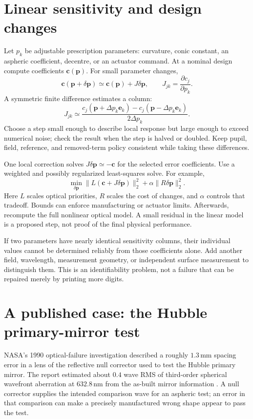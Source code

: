 \section{Linear sensitivity and design changes}
Let $p_k$ be adjustable prescription parameters: curvature, conic
constant, an aspheric coefficient, decentre, or an actuator command.
At a nominal design compute coefficients $\bm c(\bm p)$. For small
parameter changes,
\begin{equation}
 \bm c(\bm p+\delta\bm p)\simeq\bm c(\bm p)+J\delta\bm p,
 \qquad J_{jk}=\frac{\partial c_j}{\partial p_k}.
\end{equation}
A symmetric finite difference estimates a column:
\begin{equation}
 J_{jk}\simeq\frac{c_j(\bm p+\Delta p_k\bm e_k)
                       -c_j(\bm p-\Delta p_k\bm e_k)}{2\Delta p_k}.
\end{equation}
Choose a step small enough to describe local response but large enough
to exceed numerical noise; check the result when the step is halved
or doubled. Keep pupil, field, reference, and removed-term policy
consistent while taking these differences.

One local correction solves $J\delta\bm p\simeq-\bm c$ for the
selected error coefficients. Use a weighted and possibly regularized
least-squares solve. For example,
\begin{equation}
 \min_{\delta\bm p}
   \lVert L(\bm c+J\delta\bm p)\rVert_2^2
      +\alpha\lVert R\delta\bm p\rVert_2^2.
\end{equation}
Here $L$ scales optical priorities, $R$ scales the cost of changes,
and $\alpha$ controls that tradeoff. Bounds can enforce manufacturing
or actuator limits. Afterwards, recompute the full nonlinear optical
model. A small residual in the linear model is a proposed step, not
proof of the final physical performance.

If two parameters have nearly identical sensitivity columns, their
individual values cannot be determined reliably from those coefficients
alone. Add another field, wavelength, measurement geometry, or
independent surface measurement to distinguish them. This is an
identifiability problem, not a failure that can be repaired merely by
printing more digits.

\section{A published case: the Hubble primary-mirror test}
NASA's 1990 optical-failure investigation described a roughly
$1.3\,\mathrm{mm}$ spacing error in a lens of the reflective null
corrector used to test the Hubble primary mirror. The report estimated
about $0.4$ wave RMS of third-order spherical wavefront aberration at
$632.8\,\mathrm{nm}$ from the as-built mirror information
\cite{zc:hubble}. A null corrector supplies the intended comparison
wave for an aspheric test; an error in that comparison can make a
precisely manufactured wrong shape appear to pass the test.

